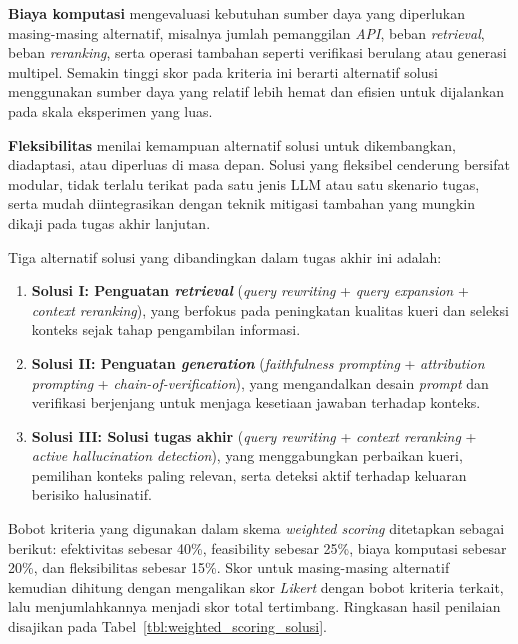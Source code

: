 \textbf{Biaya komputasi} mengevaluasi kebutuhan sumber daya yang diperlukan masing-masing alternatif, misalnya jumlah pemanggilan \textit{API}, beban \textit{retrieval}, beban \textit{reranking}, serta operasi tambahan seperti verifikasi berulang atau generasi multipel. Semakin tinggi skor pada kriteria ini berarti alternatif solusi menggunakan sumber daya yang relatif lebih hemat dan efisien untuk dijalankan pada skala eksperimen yang luas.

\textbf{Fleksibilitas} menilai kemampuan alternatif solusi untuk dikembangkan, diadaptasi, atau diperluas di masa depan. Solusi yang fleksibel cenderung bersifat modular, tidak terlalu terikat pada satu jenis LLM atau satu skenario tugas, serta mudah diintegrasikan dengan teknik mitigasi tambahan yang mungkin dikaji pada tugas akhir lanjutan.

Tiga alternatif solusi yang dibandingkan dalam tugas akhir ini adalah:
\begin{enumerate}[1.]
  \item \textbf{Solusi I: Penguatan \textit{retrieval}} (\textit{query rewriting} + \textit{query expansion} + \textit{context reranking}), yang berfokus pada peningkatan kualitas kueri dan seleksi konteks sejak tahap pengambilan informasi.
  \item \textbf{Solusi II: Penguatan \textit{generation}} (\textit{faithfulness prompting} + \textit{attribution prompting} + \textit{chain-of-verification}), yang mengandalkan desain \textit{prompt} dan verifikasi berjenjang untuk menjaga kesetiaan jawaban terhadap konteks.
  \item \textbf{Solusi III: Solusi tugas akhir} (\textit{query rewriting} + \textit{context reranking} + \textit{active hallucination detection}), yang menggabungkan perbaikan kueri, pemilihan konteks paling relevan, serta deteksi aktif terhadap keluaran berisiko halusinatif.
\end{enumerate}

Bobot kriteria yang digunakan dalam skema \textit{weighted scoring} ditetapkan sebagai berikut: efektivitas sebesar 40\%, feasibility sebesar 25\%, biaya komputasi sebesar 20\%, dan fleksibilitas sebesar 15\%. Skor untuk masing-masing alternatif kemudian dihitung dengan mengalikan skor \textit{Likert} dengan bobot kriteria terkait, lalu menjumlahkannya menjadi skor total tertimbang. Ringkasan hasil penilaian disajikan pada Tabel~\ref{tbl:weighted_scoring_solusi}.

